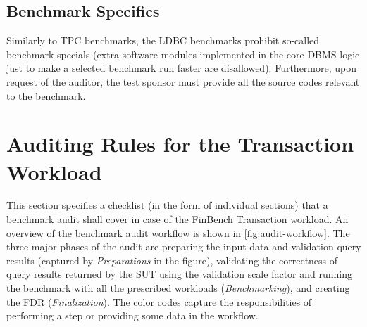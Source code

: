 \subsection{Benchmark Specifics}

Similarly to TPC benchmarks, the LDBC benchmarks prohibit so-called benchmark specials (\ie extra software modules implemented in the core DBMS logic just to make a selected benchmark run faster are disallowed). Furthermore, upon request of the auditor, the test sponsor must provide all the source codes relevant to the benchmark.


\section{Auditing Rules for the Transaction Workload}


This section specifies a checklist (in the form of individual sections) that a benchmark audit shall cover in case of the FinBench Transaction workload. An overview of the benchmark audit workflow is shown in \autoref{fig:audit-workflow}. The three major phases of the audit are preparing the input data and validation query results (captured by \emph{Preparations} in the figure), validating the correctness of query results returned by the SUT using the validation scale factor and running the benchmark with all the prescribed workloads (\emph{Benchmarking}), and creating the FDR (\emph{Finalization}). The color codes capture the responsibilities of performing a step or providing some data in the workflow.

